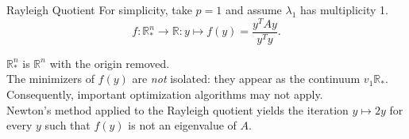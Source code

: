 \documentclass[xcolor=dvipsnames,t]{beamer} %
\newcommand{\reals}{\mathbb{R}}
\begin{document}
\begin{frame}{Rayleigh Quotient}
   For simplicity, take $p=1$ and assume $\lambda_1$ has multiplicity 1.\\

   \[ f: \reals^n_\ast \to \reals: y\mapsto f(y) = \dfrac{y^TAy}{y^Ty}. \] 

   \noindent $\reals^n_\ast$ is $\reals^n$ with the origin removed.\\[.5em]
   

   \noindent The minimizers of $f(y)$ are \emph{not} isolated: they appear as the continuum $v_1\reals_\ast$.\\[.5em]

   \noindent Consequently, important optimization algorithms may not apply.\\[.5em]
   
   \noindent Newton's method applied to the Rayleigh quotient yields the iteration $y\mapsto 2y$ for every $y$ such that $f(y)$ is not an eigenvalue of $A$.
\end{frame}
\end{document}
